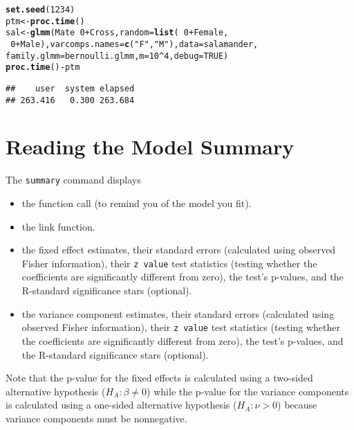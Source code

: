 \documentclass[11pt]{article}\usepackage[]{graphicx}\usepackage[]{color}
\makeatletter
\newcommand{\hlnum}[1]{\textcolor[rgb]{0.686,0.059,0.569}{#1}}%
\newcommand{\hlstr}[1]{\textcolor[rgb]{0.192,0.494,0.8}{#1}}%
\newcommand{\hlopt}[1]{\textcolor[rgb]{0,0,0}{#1}}%
\newcommand{\hlstd}[1]{\textcolor[rgb]{0.345,0.345,0.345}{#1}}%
\newcommand{\hlkwb}[1]{\textcolor[rgb]{0.69,0.353,0.396}{#1}}%
\newcommand{\hlkwc}[1]{\textcolor[rgb]{0.333,0.667,0.333}{#1}}%
\newcommand{\hlkwd}[1]{\textcolor[rgb]{0.737,0.353,0.396}{\textbf{#1}}}%
\newenvironment{kframe}{%
 \def\at@end@of@kframe{}%
 \ifinner\ifhmode%
  \def\at@end@of@kframe{\end{minipage}}%
  \begin{minipage}{\columnwidth}%
 \fi\fi%
 \def\FrameCommand##1{\hskip\@totalleftmargin \hskip-\fboxsep
 \colorbox{shadecolor}{##1}\hskip-\fboxsep
     \hskip-\linewidth \hskip-\@totalleftmargin \hskip\columnwidth}%
 \MakeFramed {\advance\hsize-\width
   \@totalleftmargin\z@ \linewidth\hsize
   \@setminipage}}%
 {\par\unskip\endMakeFramed%
 \at@end@of@kframe}
\newenvironment{knitrout}{}{} %
\makeatother
\begin{document}
\begin{knitrout}
\color{fgcolor}\begin{kframe}
\begin{alltt}
\hlkwd{set.seed}\hlstd{(}\hlnum{1234}\hlstd{)}
\hlstd{ptm}\hlkwb{<-}\hlkwd{proc.time}\hlstd{()}
\hlstd{sal} \hlkwb{<-} \hlkwd{glmm}\hlstd{(Mate} \hlopt{~} \hlnum{0} \hlopt{+} \hlstd{Cross,} \hlkwc{random} \hlstd{=} \hlkwd{list}\hlstd{(}\hlopt{~} \hlnum{0} \hlopt{+} \hlstd{Female,}
\hlopt{~} \hlnum{0} \hlopt{+} \hlstd{Male),} \hlkwc{varcomps.names} \hlstd{=} \hlkwd{c}\hlstd{(}\hlstr{"F"}\hlstd{,} \hlstr{"M"}\hlstd{),} \hlkwc{data} \hlstd{= salamander,}
\hlkwc{family.glmm} \hlstd{= bernoulli.glmm,} \hlkwc{m} \hlstd{=} \hlnum{10}\hlopt{^}\hlnum{4}\hlstd{,} \hlkwc{debug} \hlstd{=} \hlnum{TRUE}\hlstd{)}
\hlkwd{proc.time}\hlstd{()} \hlopt{-} \hlstd{ptm}
\end{alltt}
\begin{verbatim}
##    user  system elapsed 
## 263.416   0.300 263.684
\end{verbatim}
\end{kframe}
\end{knitrout}


\section{Reading the Model Summary}\label{sec:summary}

The \texttt{summary} command displays
\begin{itemize}
\item the function call (to remind you of the model you fit).
\item the link function.
\item the fixed effect estimates, their standard errors (calculated using observed Fisher information), their \texttt{z value} test statistics (testing whether the coefficients are significantly different from zero), the test's p-values, and the R-standard significance stars (optional).
\item the variance component estimates, their standard errors (calculated using observed Fisher information), their \texttt{z value} test statistics (testing whether the coefficients are significantly different from zero), the test's p-values, and the R-standard significance stars (optional).
\end{itemize}



Note that the p-value for the fixed effects is calculated using a two-sided alternative hypothesis ($H_A: \beta \neq 0$) while the p-value for the variance components is calculated using a one-sided alternative hypothesis ($H_A: \nu >0$) because variance components must be nonnegative.\\
\end{document}
